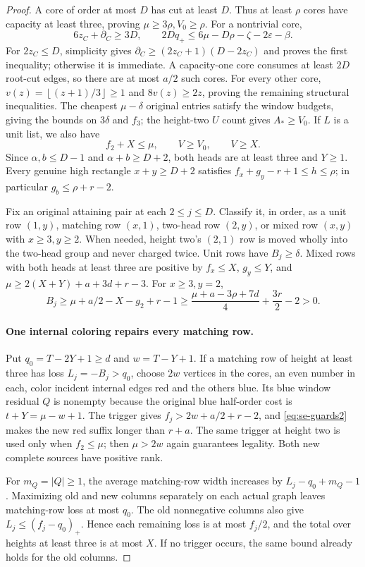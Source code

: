\documentclass[11pt,a4paper]{article}
\newcommand{\floor}[1]{\left\lfloor#1\right\rfloor}
\theoremstyle{definition}
\begin{document}
\begin{proof}
A core of order at most $D$ has cut at least $D$. Thus at least $\rho$ cores have capacity at least three, proving $\mu\ge3\rho,V_0\ge\rho$. For a nontrivial core,
\[
6z_C+\partial_C\ge3D,\qquad
2Dq_+\le6\mu-D\rho-\zeta-2\varepsilon-\beta.
\]
For $2z_C\le D$, simplicity gives $\partial_C\ge(2z_C+1)(D-2z_C)$ and proves the first inequality; otherwise it is immediate. A capacity-one core consumes at least $2D$ root-cut edges, so there are at most $a/2$ such cores. For every other core, $v(z)=\floor{(z+1)/3}\ge1$ and $8v(z)\ge2z$, proving the remaining structural inequalities. The cheapest $\mu-\delta$ original entries satisfy the window budgets, giving the bounds on $3\delta$ and $f_3$; the height-two $U$ count gives $A_*\ge V_0$. If $L$ is a unit list, we also have
\[
f_2+X\le\mu,\qquad V\ge V_0,\qquad V\ge X.
\]
Since $\alpha,b\le D-1$ and $\alpha+b\ge D+2$, both heads are at least three and $Y\ge1$. Every genuine high rectangle $x+y\ge D+2$ satisfies $f_x+g_y-r+1\le h\le\rho$; in particular $g_b\le\rho+r-2$.

Fix an original attaining pair at each $2\le j\le D$. Classify it, in order, as a unit row $(1,y)$, matching row $(x,1)$, two-head row $(2,y)$, or mixed row $(x,y)$ with $x\ge3,y\ge2$. When needed, height two's $(2,1)$ row is moved wholly into the two-head group and never charged twice. Unit rows have $B_j\ge\delta$. Mixed rows with both heads at least three are positive by $f_x\le X$, $g_y\le Y$, and $\mu\ge2(X+Y)+a+3d+r-3$. For $x\ge3,y=2$,
\[
B_j\ge\mu+a/2-X-g_2+r-1
\ge\frac{\mu+a-3\rho+7d}{4}+\frac{3r}{2}-2>0.
\]
\paragraph{One internal coloring repairs every matching row.}
Put $q_0=T-2Y+1\ge d$ and $w=T-Y+1$. If a matching row of height at least three has loss $L_j=-B_j>q_0$, choose $2w$ vertices in the cores, an even number in each, color incident internal edges red and the others blue. Its blue window residual $Q$ is nonempty because the original blue half-order cost is $t+Y=\mu-w+1$. The trigger gives $f_j>2w+a/2+r-2$, and \eqref{eq:se-guards2} makes the new red suffix longer than $r+a$. The same trigger at height two is used only when $f_2\le\mu$; then $\mu>2w$ again guarantees legality. Both new complete sources have positive rank.

For $m_Q=|Q|\ge1$, the average matching-row width increases by $L_j-q_0+m_Q-1$. Maximizing old and new columns separately on each actual graph leaves matching-row loss at most $q_0$. The old nonnegative columns also give $L_j\le(f_j-q_0)_+$. Hence each remaining loss is at most $f_j/2$, and the total over heights at least three is at most $X$. If no trigger occurs, the same bound already holds for the old columns.

\end{proof}
\end{document}
